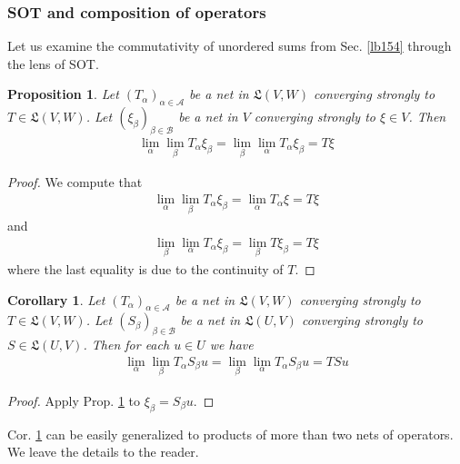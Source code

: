 \documentclass[12pt,b5paper,notitlepage]{article}
\theoremstyle{definition}
\theoremstyle{plain}
\newtheorem{pp}[df]{Proposition}
\newtheorem{co}[df]{Corollary}
\newcommand{\fk}{\mathfrak}
\newcommand{\scr}{\mathscr}
\numberwithin{equation}{section}
\begin{document}
\subsubsection{SOT and composition of operators}


Let us examine the commutativity of unordered sums from Sec. \ref{lb154} through the lens of SOT.


\begin{pp}\label{lb156}
Let $(T_\alpha)_{\alpha\in\scr A}$ be a net in $\fk L(V,W)$ converging strongly to $T\in\fk L(V,W)$. Let $(\xi_\beta)_{\beta\in\scr B}$ be a net in $V$ converging strongly to $\xi\in V$. Then 
\begin{align}
\lim_\alpha \lim_\beta T_\alpha \xi_\beta=\lim_\beta\lim_\alpha T_\alpha \xi_\beta=T\xi
\end{align}
\end{pp}

\begin{proof}
We compute that
\begin{align*}
\lim_\alpha\lim_\beta T_\alpha \xi_\beta=\lim_\alpha T_\alpha \xi=T\xi
\end{align*}
and
\begin{align*}
\lim_\beta\lim_\alpha T_\alpha \xi_\beta=\lim_\beta T\xi_\beta=T\xi
\end{align*}
where the last equality is due to the continuity of $T$.
\end{proof}


\begin{co}\label{lb158}
Let $(T_\alpha)_{\alpha\in\scr A}$ be a net in $\fk L(V,W)$ converging strongly to $T\in\fk L(V,W)$. Let $(S_\beta)_{\beta\in\scr B}$ be a net in $\fk L(U,V)$ converging strongly to $S\in\fk L(U,V)$. Then for each $u\in U$ we have
\begin{align}
\lim_\alpha \lim_\beta T_\alpha S_\beta u=\lim_\beta\lim_\alpha T_\alpha S_\beta u=TSu
\end{align}
\end{co}

\begin{proof}
Apply Prop. \ref{lb156} to $\xi_\beta= S_\beta u$.
\end{proof}

Cor. \ref{lb158} can be easily generalized to products of more than two nets of operators. We leave the details to the reader.
\end{document}
